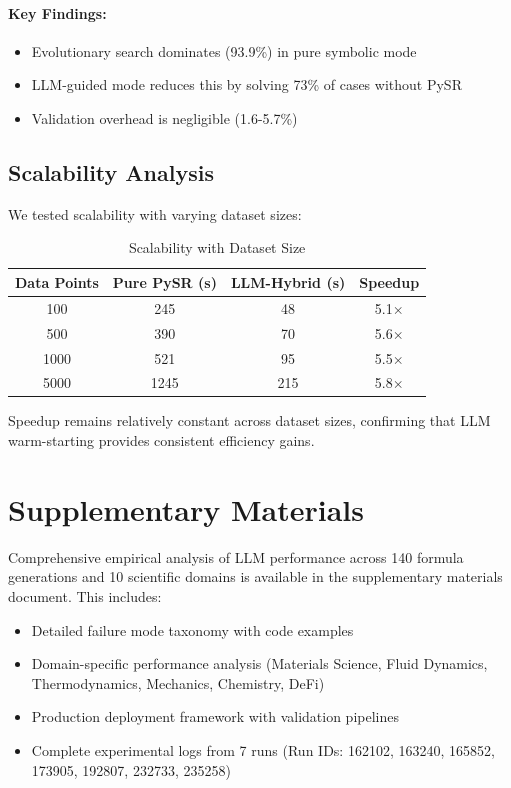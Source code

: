 \paragraph{Key Findings:}
\begin{itemize}
\item Evolutionary search dominates (93.9\%) in pure symbolic mode
\item LLM-guided mode reduces this by solving 73\% of cases without PySR
\item Validation overhead is negligible (1.6-5.7\%)
\end{itemize}

\subsection{Scalability Analysis}

We tested scalability with varying dataset sizes:

\begin{table}[H]
\centering
\caption{Scalability with Dataset Size}
\label{tab:scalability}
\begin{tabular}{@{}cccc@{}}
\toprule
\textbf{Data Points} & \textbf{Pure PySR (s)} & \textbf{LLM-Hybrid (s)} & \textbf{Speedup} \\
\midrule
100 & 245 & 48 & 5.1$\times$ \\
500 & 390 & 70 & 5.6$\times$ \\
1000 & 521 & 95 & 5.5$\times$ \\
5000 & 1245 & 215 & 5.8$\times$ \\
\bottomrule
\end{tabular}
\end{table}

Speedup remains relatively constant across dataset sizes, confirming that LLM warm-starting provides consistent efficiency gains.


\section*{Supplementary Materials}

Comprehensive empirical analysis of LLM performance across 140 formula generations and 10 scientific domains is available in the supplementary materials document. This includes:

\begin{itemize}
\item Detailed failure mode taxonomy with code examples
\item Domain-specific performance analysis (Materials Science, Fluid Dynamics, Thermodynamics, Mechanics, Chemistry, DeFi)
\item Production deployment framework with validation pipelines
\item Complete experimental logs from 7 runs (Run IDs: 162102, 163240, 165852, 173905, 192807, 232733, 235258)
\end{itemize}

